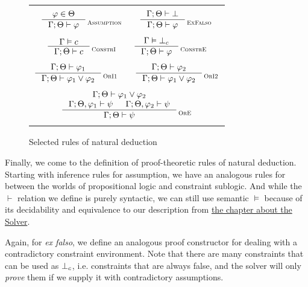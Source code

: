 \documentclass[english, mgr]{iithesis}
\renewcommand{\it}[1]{\textit{#1}}
\newcommand{\scbrk}[2]{\myatop{\textsc{#1}}{\textsc{#2}}}
\begin{document}
\begin{figure}[htbp]
  \centering
  \begin{tabularx}{\textwidth}{|C|}
  \hline \\ $
  \inference{
    \formphi \in \Theta
  }{
    \jgmnt[\cEnv;\Theta]{\formphi}
  }\scbrk{}{Assumption}
  \qquad
  \inference{
    \jgmnt[\cEnv;\Theta]{\bot}
  }{
    \jgmnt[\cEnv;\Theta]{\formphi}
  }\scbrk{}{ExFalso}
  $ \\ \\ $
  \inference{
    \cjgmnt[\cEnv]{\constr}
  }{
    \jgmnt[\cEnv;\Theta]{\constr}
  }\scbrk{}{ConstrI}
  \qquad
  \inference{
    \cjgmnt[\cEnv]{\bot_\constr}
    }{
    \jgmnt[\cEnv;\Theta]{\formphi}
  }\scbrk{}{ConstrE}
  $ \\ \\ $
  \inference{
    \jgmnt[\cEnv;\Theta]{\formphi_1}
    }{
    \jgmnt[\cEnv;\Theta]{\formphi_1 \vee \formphi_2}
  }\scbrk{}{OrI1}
  \qquad
  \inference{
    \jgmnt[\cEnv;\Theta]{\formphi_2}
  }{
    \jgmnt[\cEnv;\Theta]{\formphi_1 \vee \formphi_2}
  }\scbrk{}{OrI2}
  $ \\ \\ $
  \inference{
    \jgmnt[\cEnv;\Theta]{\formphi_1 \vee \formphi_2} \\
    \jgmnt[\cEnv;\Theta,\formphi_1]{\psi} &
    \jgmnt[\cEnv;\Theta,\formphi_2]{\psi}
  }{
    \jgmnt[\cEnv;\Theta]{\psi}
  }\scbrk{}{OrE}
  $ \\ \\ \hline
  \end{tabularx}
  \caption{Selected rules of natural deduction}
  \label{fig:deduction}
\end{figure}
Finally, we come to the definition of proof-theoretic rules of natural deduction.
Starting with inference rules for assumption,
we have an analogous rules for  between the worlds of propositional logic
and constraint sublogic.
And while the $\vdash$ relation we define is purely syntactic,
we can still use semantic $\vDash$ because of its decidability and equivalence
to our description from \hyperref[sec:solver]{the chapter about the Solver}.

Again, for \it{ex falso}, we define an analogous proof constructor for dealing with a contradictory
constraint environment.
Note that there are many constraints that can be used as $\bot_c$, i.e.
constraints that are always false, and the solver will only \it{prove} them
if we supply it with contradictory assumptions.

\newpage
\end{document}
